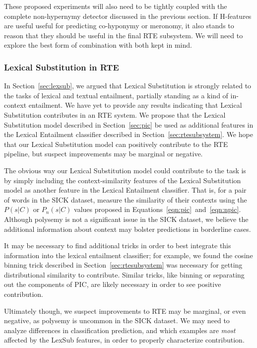 \documentclass[12pt]{article}
\begin{document}
These proposed experiments will also need to be tightly coupled with the
complete non-hypernymy detector discussed in the previous section. If H-features
are useful useful for predicting co-hyponymy or meronomy, it also stands to
reason that they should be useful in the final RTE subsystem. We will need to
explore the best form of combination with both kept in mind.

\subsubsection{Lexical Substitution in RTE}

In Section~\ref{sec:lexsub}, we argued that Lexical Substitution is strongly
related to the tasks of lexical and textual entailment, partially standing
as a kind of in-context entailment. We have yet to provide any results
indicating that Lexical Substitution contributes in an
RTE system.  We propose that the Lexical Substitution model described in
Section~\ref{sec:pic} be used as additional features in the Lexical
Entailment classifier described in Section~\ref{sec:rtesubsystem}. We hope that
our Lexical Substitution model can positively contribute to the RTE pipeline,
but suspect improvements may be marginal or negative.

The obvious way our Lexical Substitution model could contribute to the
task is by simply including the context-similarity features of the Lexical
Substitution model as another feature in the Lexical Entailment classifier.
That is, for a pair of words in the SICK dataset, measure the similarity of
their contexts using the $P(s|C)$ or $P_n(s|C)$ values proposed in
Equations~\ref{eqn:pic}~and~\ref{eqn:npic}. Although polysemy is not a
significant issue in the SICK dataset, we believe the additional information
about context may bolster predictions in borderline cases.

It may be necessary to find additional tricks in order to best integrate
this information into the lexical entailment classifier; for example, we
found the cosine binning trick described in Section~\ref{sec:rtesubsystem}
was necessary for getting distributional similarity to contribute. Similar
tricks, like binning or separating out the components of PIC, are likely
necessary in order to see positive contribution.

Ultimately though, we suspect improvements to RTE  may be marginal, or even
negative, as polysemy is uncommon in the SICK dataset. We may need to analyze
differences in classification prediction, and which examples are {\em most}
affected by the LexSub features, in order to properly characterize contribution.
\end{document}
